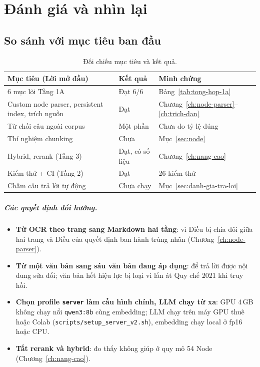 \chapter{Đánh giá và nhìn lại}
\label{sec:muc-11-1}

\section{So sánh với mục tiêu ban đầu}

\begin{table}[H]
  \centering
  \small
  \begin{tabularx}{\textwidth}{X l X}
    \toprule
    \textbf{Mục tiêu (Lời mở đầu)} & \textbf{Kết quả} & \textbf{Minh chứng} \\
    \midrule
    6 mục lõi Tầng 1A & Đạt 6/6 & Bảng~\ref{tab:tong-hop-1a} \\
    Custom node parser, persistent index, trích nguồn & Đạt & Chương~\ref{ch:node-parser}--\ref{ch:trich-dan} \\
    Từ chối câu ngoài corpus & Một phần & Chưa đo tỷ lệ đúng \\
    Thí nghiệm chunking & Chưa & Mục~\ref{sec:node} \\
    Hybrid, rerank (Tầng 3) & Đạt, có số liệu & Chương~\ref{ch:nang-cao} \\
    Kiểm thử + CI (Tầng 2) & Đạt & 26 kiểm thử \\
    Chấm câu trả lời tự động & Chưa chạy & Mục~\ref{sec:danh-gia-tra-loi} \\
    \bottomrule
  \end{tabularx}
  \caption{Đối chiếu mục tiêu và kết quả.}
\end{table}

\paragraph{Các quyết định đổi hướng.}
\begin{itemize}
  \item \textbf{Từ OCR theo trang sang Markdown hai tầng}: vì Điều bị chia đôi giữa hai trang và Điều của
        quyết định ban hành trùng nhãn (Chương~\ref{ch:node-parser}).
  \item \textbf{Từ một văn bản sang sáu văn bản đang áp dụng}: để trả lời được nội dung sửa đổi; văn bản hết
        hiệu lực bị loại vì lấn át Quy chế 2021 khi truy hồi.
  \item \textbf{Chọn profile \texttt{server} làm cấu hình chính, LLM chạy từ xa}: GPU 4\,GB không chạy nổi
        \texttt{qwen3:8b} cùng embedding; LLM chạy trên máy GPU thuê hoặc Colab
        (\texttt{scripts/setup\_server\_v2.sh}), embedding chạy local ở fp16 hoặc CPU.
  \item \textbf{Tắt rerank và hybrid}: đo thấy không giúp ở quy mô 54 Node (Chương~\ref{ch:nang-cao}).
\end{itemize}

